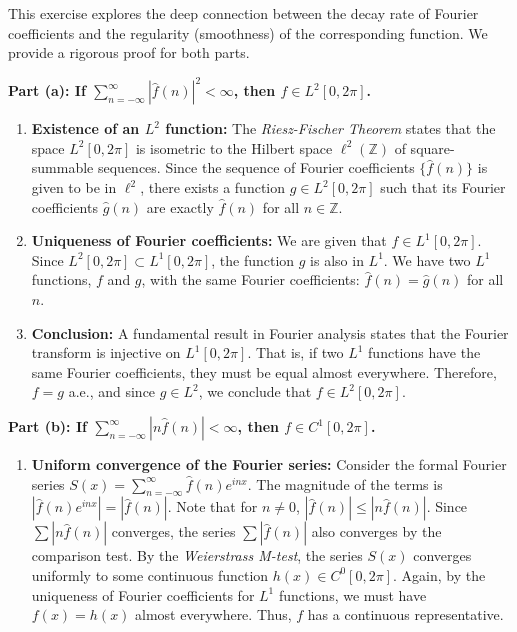 \begin{solution}
This exercise explores the deep connection between the decay rate of Fourier coefficients and the regularity (smoothness) of the corresponding function. We provide a rigorous proof for both parts.

\textbf{Part (a): If $\sum_{n=-\infty}^{\infty} |\hat{f}(n)|^2 < \infty$, then $f \in L^2[0, 2\pi]$.}

\begin{enumerate}
    \item \textbf{Existence of an $L^2$ function:} The \textit{Riesz-Fischer Theorem} states that the space $L^2[0, 2\pi]$ is isometric to the Hilbert space $\ell^2(\mathbb{Z})$ of square-summable sequences. Since the sequence of Fourier coefficients $\{\hat{f}(n)\}$ is given to be in $\ell^2$, there exists a function $g \in L^2[0, 2\pi]$ such that its Fourier coefficients $\hat{g}(n)$ are exactly $\hat{f}(n)$ for all $n \in \mathbb{Z}$.
    \item \textbf{Uniqueness of Fourier coefficients:} We are given that $f \in L^1[0, 2\pi]$. Since $L^2[0, 2\pi] \subset L^1[0, 2\pi]$, the function $g$ is also in $L^1$. We have two $L^1$ functions, $f$ and $g$, with the same Fourier coefficients: $\hat{f}(n) = \hat{g}(n)$ for all $n$.
    \item \textbf{Conclusion:} A fundamental result in Fourier analysis states that the Fourier transform is injective on $L^1[0, 2\pi]$. That is, if two $L^1$ functions have the same Fourier coefficients, they must be equal almost everywhere. Therefore, $f = g$ a.e., and since $g \in L^2$, we conclude that $f \in L^2[0, 2\pi]$.
\end{enumerate}

\textbf{Part (b): If $\sum_{n=-\infty}^{\infty} |n \hat{f}(n)| < \infty$, then $f \in C^1[0, 2\pi]$.}

\begin{enumerate}
    \item \textbf{Uniform convergence of the Fourier series:}
    Consider the formal Fourier series $S(x) = \sum_{n=-\infty}^\infty \hat{f}(n) e^{inx}$.
    The magnitude of the terms is $|\hat{f}(n) e^{inx}| = |\hat{f}(n)|$.
    Note that for $n \neq 0$, $|\hat{f}(n)| \leq |n \hat{f}(n)|$. Since $\sum |n \hat{f}(n)|$ converges, the series $\sum |\hat{f}(n)|$ also converges by the comparison test.
    By the \textit{Weierstrass M-test}, the series $S(x)$ converges uniformly to some continuous function $h(x) \in C^0[0, 2\pi]$.
    Again, by the uniqueness of Fourier coefficients for $L^1$ functions, we must have $f(x) = h(x)$ almost everywhere. Thus, $f$ has a continuous representative.


\end{enumerate}
\end{solution}
